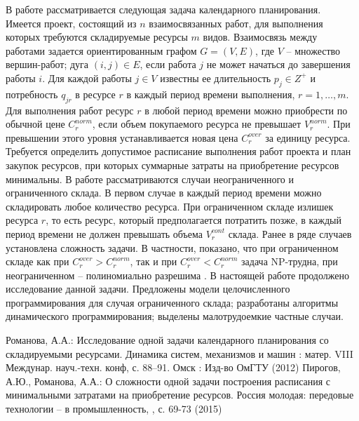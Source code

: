 В работе рассматривается следующая задача календарного
планирования. Имеется проект, состоящий из $n$ взаимосвязанных
работ, для выполнения которых требуются складируемые ресурсы $m$
видов. Взаимосвязь между работами задается ориентированным графом
$G=(V,E)$, где $V$ -- множество вершин-работ; дуга $(i,j)\in E$,
если работа $j$ не может начаться до завершения работы $i$. Для
каждой работы $j\in V$ известны ее длительность $p_{j} \in Z^+$ и
потребность $q_{jr}$ в ресурсе $r$ в каждый период времени
выполнения, $r=1,\ldots,m$. Для выполнения работ ресурс $r$  в
любой период времени можно приобрести по обычной цене
$C^{norm}_r$, если объем покупаемого ресурса не превышает
$V^{norm}_r$. При превышении этого уровня устанавливается новая
цена $C^{over}_r$ за единицу ресурса. Требуется определить
допустимое расписание выполнения работ проекта и план закупок
ресурсов, при которых суммарные затраты на приобретение ресурсов
минимальны. В работе рассматриваются случаи неограниченного и
ограниченного склада. В первом случае в каждый период времени
можно складировать любое количество ресурса. При ограниченном
складе излишек ресурса $r$, то есть ресурс, который предполагается
потратить позже, в каждый период времени не должен превышать
объема $V^{cont}_r$ склада. 
Ранее в ряде случаев установлена
сложность задачи. В частности, показано, что при ограниченном
складе как при $C^{over}_r>C^{norm}_r$, так и при
$C^{over}_r<C^{norm}_r$ задача NP-трудна, при неограниченном --
полиномиально разрешима \cite{romanova_R,romanova_PR}.
В настоящей работе продолжено исследование данной задачи.
Предложены модели целочисленного программирования для случая
ограниченного склада; разработаны алгоритмы динамического
программирования; выделены малотрудоемкие частные случаи.
\begin{thebibliography}{1}
\providecommand{\url}[1]{\texttt{#1}}
\providecommand{\urlprefix}{URL }

Романова, А.А.: Исследование одной задачи календарного
планирования со складируемыми ресурсами. Динамика систем,
механизмов и машин : матер. VIII Междунар. науч.-техн. конф, с.
88--91.  Омск : Изд-во ОмГТУ (2012)
Пирогов, А.Ю., Романова, А.А.: О сложности одной задачи построения
расписания с минимальными затратами на приобретение ресурсов.
Россия молодая: передовые технологии -- в промышленность, ,
с. 69-73 (2015)
\end{thebibliography}
